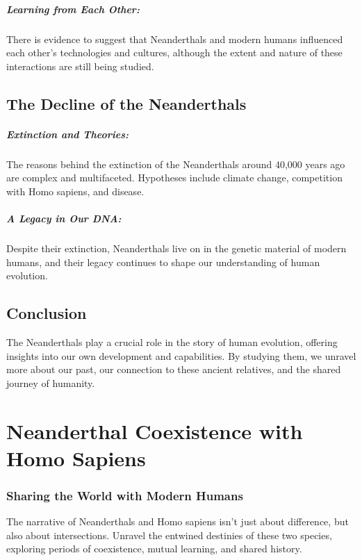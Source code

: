 \documentclass[a4paper,12pt]{book}
\begin{document}
\paragraph{Learning from Each Other:}
There is evidence to suggest that Neanderthals and modern humans influenced each other’s technologies and cultures, although the extent and nature of these interactions are still being studied.

\section*{The Decline of the Neanderthals}

\paragraph{Extinction and Theories:}
The reasons behind the extinction of the Neanderthals around 40,000 years ago are complex and multifaceted. Hypotheses include climate change, competition with Homo sapiens, and disease.

\paragraph{A Legacy in Our DNA:}
Despite their extinction, Neanderthals live on in the genetic material of modern humans, and their legacy continues to shape our understanding of human evolution.

\section*{Conclusion}

The Neanderthals play a crucial role in the story of human evolution, offering insights into our own development and capabilities. By studying them, we unravel more about our past, our connection to these ancient relatives, and the shared journey of humanity.

\chapter{Neanderthal Coexistence with Homo Sapiens}
\subsection*{Sharing the World with Modern Humans}
The narrative of Neanderthals and Homo sapiens isn't just about difference, but also about intersections. Unravel the entwined destinies of these two species, exploring periods of coexistence, mutual learning, and shared history.
\end{document}
